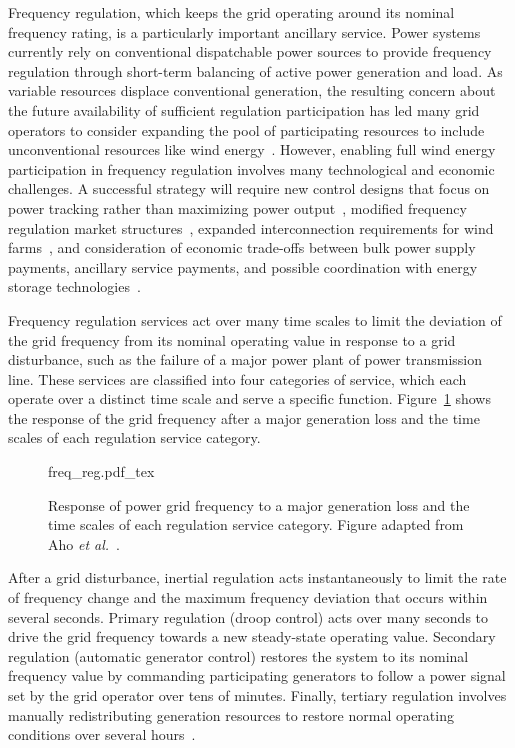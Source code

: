Frequency regulation, which keeps the grid operating around its nominal frequency rating, is a particularly important ancillary service. Power systems currently rely on conventional dispatchable power sources to provide frequency regulation through short-term balancing of active power generation and load. As variable resources displace conventional generation, the resulting concern about the future availability of sufficient regulation participation has led many grid operators to consider expanding the pool of participating resources to include unconventional resources like wind energy~\cite{Aho2012a, DiazGonzalez2014a}. However, enabling full wind energy participation in frequency regulation involves many technological and economic challenges. A successful strategy will require new control designs that focus on power tracking rather than maximizing power output~\cite{Aho2012a}, modified frequency regulation market structures~\cite{Ela2014a, Ela2014b, Ela2014c}, expanded interconnection requirements for wind farms~\cite{Aho2012a, DiazGonzalez2014a}, and consideration of economic trade-offs between bulk power supply payments, ancillary service payments, and possible coordination with energy storage technologies~\cite{Rose2014a, Kirby2010a, DiazGonzalez2015a, Sun2010a}. 

Frequency regulation services act over many time scales to limit the deviation of the grid frequency from its nominal operating value in response to a grid disturbance, such as the failure of a major power plant of power transmission line. These services are classified into four categories of service, which each operate over a distinct time scale and serve a specific function. Figure~\ref{fig:freq-reg} shows the response of the grid frequency after a major generation loss and the time scales of each regulation service category.

\begin{figure}[h]
\begin{center}
{freq_reg.pdf_tex}
\end{center}
\caption{Response of power grid frequency to a major generation loss and the time scales of each regulation service category. Figure adapted from Aho \textit{et al.}~\cite{Aho2012a}.}
\label{fig:freq-reg}
\end{figure}

After a grid disturbance, inertial regulation acts instantaneously to limit the rate of frequency change and the maximum frequency deviation that occurs within several seconds. Primary regulation (droop control) acts over many seconds to drive the grid frequency towards a new steady-state operating value. Secondary regulation (automatic generator control) restores the system to its nominal frequency value by commanding participating generators to follow a power signal set by the grid operator over tens of minutes. Finally, tertiary regulation involves manually redistributing generation resources to restore normal operating conditions over several hours~\cite{Aho2012a, Rebours2007a, Rebours2007b}. 

